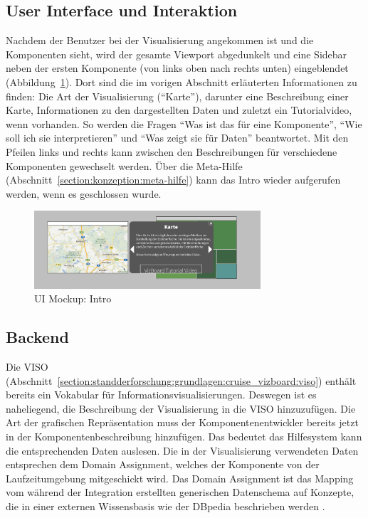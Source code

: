 \documentclass[
	headsepline,
	footsepline,
	fontsize=12pt,
	bibliography=totoc
]{scrbook}
\begin{document}
\subsection{User Interface und Interaktion}
\label{section:konzeption:intro:ui}

Nachdem der Benutzer bei der Visualisierung angekommen ist und die Komponenten sieht, wird der gesamte Viewport abgedunkelt und eine Sidebar neben der ersten Komponente (von links oben nach rechts unten) eingeblendet (Abbildung~\ref{figure:ueberblick}). Dort sind die im vorigen Abschnitt erläuterten Informationen zu finden: Die Art der Visualisierung (\enquote{Karte}), darunter eine Beschreibung einer Karte, Informationen zu den dargestellten Daten und zuletzt ein Tutorialvideo, wenn vorhanden. So werden die Fragen \enquote{Was ist das für eine Komponente}, \enquote{Wie soll ich sie interpretieren} und \enquote{Was zeigt sie für Daten} beantwortet. Mit den Pfeilen links und rechts kann zwischen den Beschreibungen für verschiedene Komponenten gewechselt werden. Über die Meta-Hilfe (Abschnitt~\ref{section:konzeption:meta-hilfe}) kann das Intro wieder aufgerufen werden, wenn es geschlossen wurde.

\begin{figure}[htbp]
   \centering
   \includegraphics[width=0.75\textwidth]{images/konzeption-ueberblick.png}
   \caption{UI Mockup: Intro}
   \label{figure:ueberblick}
\end{figure}

\subsection{Backend}
\label{section:konzeption:intro:backend}

Die VISO (Abschnitt~\ref{section:standderforschung:grundlagen:cruise_vizboard:viso}) enthält bereits ein Vokabular für Informationsvisualisierungen. Deswegen ist es naheliegend, die Beschreibung der Visualisierung in die VISO hinzuzufügen. Die Art der grafischen Repräsentation muss der Komponentenentwickler bereits jetzt in der Komponentenbeschreibung hinzufügen. Das bedeutet das Hilfesystem kann die entsprechenden Daten auslesen. Die in der Visualisierung verwendeten Daten entsprechen dem Domain Assignment, welches der Komponente von der Laufzeitumgebung mitgeschickt wird. Das Domain Assignment ist das Mapping vom während der Integration erstellten generischen Datenschema auf Konzepte, die in einer externen Wissensbasis wie der DBpedia beschrieben werden \cite{Voigt2012a}.
\end{document}

